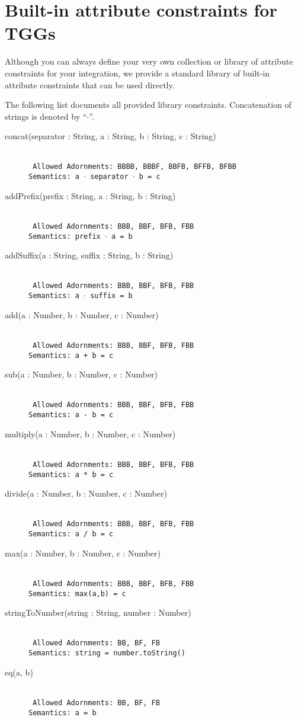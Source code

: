 \section{Built-in attribute constraints for TGGs}
\label{chap:libraryConstraints}
	
Although you can always define your very own collection or library of attribute constraints for your integration, we provide a standard library of built-in attribute constraints that can be used directly.	
	
The following list documents all provided library constraints. 
Concatenation of strings is denoted by ``$\cdot$''. 
	
\begin{description}
\item[concat(separator : String, a : String, b : String, c : String)]~\\
\texttt{
Allowed Adornments: BBBB, BBBF, BBFB, BFFB, BFBB \\
Semantics: a $\cdot$ separator $\cdot$ b = c
} 
\item[addPrefix(prefix : String, a : String, b : String)]~\\
\texttt{
Allowed Adornments: BBB, BBF, BFB, FBB  \\
Semantics: prefix $\cdot$ a = b
}
\item[addSuffix(a : String, suffix : String, b : String)]~\\
\texttt{
Allowed Adornments: BBB, BBF, BFB, FBB \\
Semantics: a $\cdot$ suffix = b 
}
\item[add(a : Number, b : Number, c : Number)]~\\
\texttt{
Allowed Adornments: BBB, BBF, BFB, FBB \\
Semantics: a + b = c
} 
\item[sub(a : Number, b : Number, c : Number)]~\\
\texttt{
Allowed Adornments: BBB, BBF, BFB, FBB \\
Semantics: a - b = c
} 
\item[multiply(a : Number, b : Number, c : Number)]~\\
\texttt{
Allowed Adornments: BBB, BBF, BFB, FBB \\
Semantics: a * b = c 
}
\item[divide(a : Number, b : Number, c : Number)]~\\
\texttt{
Allowed Adornments: BBB, BBF, BFB, FBB \\
Semantics: a / b = c 
}
\item[max(a : Number, b : Number, c : Number)]~\\
\texttt{
Allowed Adornments: BBB, BBF, BFB, FBB \\
Semantics: max(a,b) = c
}
\item[stringToNumber(string : String, number : Number)]~\\
\texttt{
Allowed Adornments: BB, BF, FB \\
Semantics: string = number.toString()
}
\item[eq(a, b)]~\\
\texttt{
Allowed Adornments: BB, BF, FB \\
Semantics: a = b 
}
\end{description}